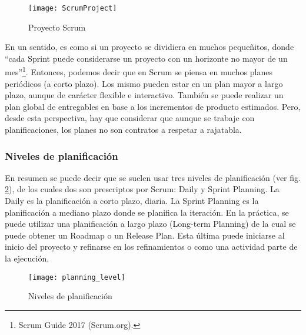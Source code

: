 \begin{figure}[h]
  \centering
  \texttt{[image: ScrumProject]}
  \caption{Proyecto Scrum}
  \centering
  \label{fig:ScrumProject} %
\end{figure}
\FloatBarrier %

En un sentido, es como si un proyecto se dividiera en muchos pequeñitos, donde “cada Sprint puede considerarse un proyecto con un horizonte no mayor de un mes”\footnote{Scrum Guide 2017 (Scrum.org).}. Entonces, podemos decir que en Scrum se piensa en muchos planes periódicos (a corto plazo). Los mismo pueden estar en un plan mayor a largo plazo, aunque de carácter flexible e interactivo. También se puede realizar un plan global de entregables en base a los incrementos de producto estimados. Pero, desde esta perspectiva, hay que considerar que aunque se trabaje con planificaciones, los planes no son contratos a respetar a rajatabla.

\subsubsection{Niveles de planificación}

En resumen se puede decir que se suelen usar tres niveles de planificación (ver fig. \ref{fig:planning_level}), de los cuales dos son prescriptos por Scrum: Daily y Sprint Planning. La Daily es la planificación a corto plazo, diaria. La Sprint Planning es la planificación a mediano plazo donde se planifica la iteración. En la práctica, se puede utilizar una planificación a largo plazo (Long-term Planning) de la cual se puede obtener un Roadmap o un Release Plan. Esta última puede iniciarse al inicio del proyecto y refinarse en los refinamientos o como una actividad parte de la ejecución.

\begin{figure}[h]
  \centering
  \texttt{[image: planning\_level]}
  \caption{Niveles de planificación}
  \centering
  \label{fig:planning_level} %
\end{figure}
\FloatBarrier %

